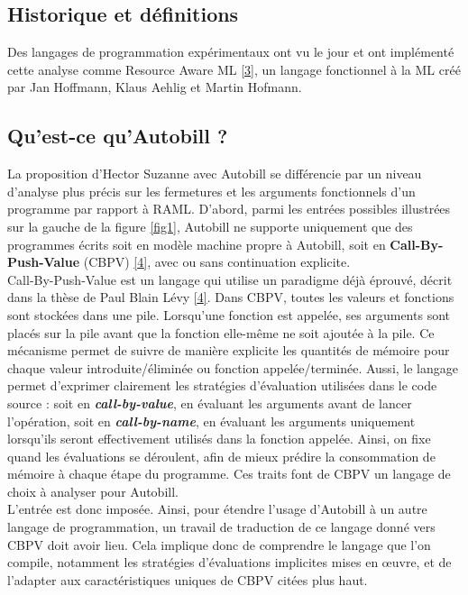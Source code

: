 \documentclass[12pt]{article}
\begin{document}
\subsection{Historique et définitions}\label{historique-et-duxe9finitions}
Des langages de programmation expérimentaux ont vu le jour et ont implémenté cette analyse comme Resource Aware ML \protect\hyperlink{ref-RAML}{{[}3{]}}, un langage fonctionnel à la ML créé par Jan Hoffmann, Klaus Aehlig et Martin Hofmann.

\hypertarget{quest-ce-quautobill}{%
  \subsection{Qu'est-ce qu'Autobill ?}\label{quest-ce-quautobill}}

La proposition d'Hector Suzanne avec Autobill se différencie par un
niveau d'analyse plus précis sur les fermetures et les arguments
fonctionnels d'un programme par rapport à RAML. D'abord, parmi les entrées possibles
illustrées sur la gauche de la figure \ref{fig1}, Autobill ne supporte
uniquement que des programmes écrits soit en modèle machine propre à
Autobill, soit en \textbf{Call-By-Push-Value} (CBPV)
\protect\hyperlink{ref-Levy}{{[}4{]}}, avec ou sans continuation
explicite. \\ 

Call-By-Push-Value est un langage qui utilise un paradigme déjà éprouvé,
décrit dans la thèse de Paul Blain Lévy
\protect\hyperlink{ref-Levy}{{[}4{]}}. Dans CBPV, toutes les valeurs et fonctions sont stockées dans une pile. Lorsqu'une fonction est appelée, ses arguments sont placés sur la pile avant que la fonction elle-même ne soit ajoutée à la pile. Ce mécanisme permet de suivre de manière explicite les quantités de mémoire pour chaque valeur introduite/éliminée ou fonction appelée/terminée. Aussi,
le langage permet d'exprimer clairement les stratégies d'évaluation utilisées dans le code source : soit en \textbf{\textit{call-by-value}}, en évaluant les arguments avant de lancer l'opération, soit en \textbf{\textit{call-by-name}}, en évaluant les arguments uniquement lorsqu’ils seront effectivement utilisés dans la fonction appelée. Ainsi, on fixe quand les évaluations se déroulent, afin de mieux prédire la consommation de mémoire à chaque
étape du programme. Ces traits font de CBPV un langage de choix à analyser pour Autobill. \\

L'entrée est donc imposée. Ainsi, pour étendre l'usage d'Autobill à un
autre langage de programmation, un travail de traduction de ce langage
donné vers CBPV doit avoir lieu. Cela implique donc de comprendre le
langage que l'on compile, notamment les stratégies d'évaluations
implicites mises en œuvre, et de l'adapter aux caractéristiques uniques
de CBPV citées plus haut. \\ 
\end{document}
